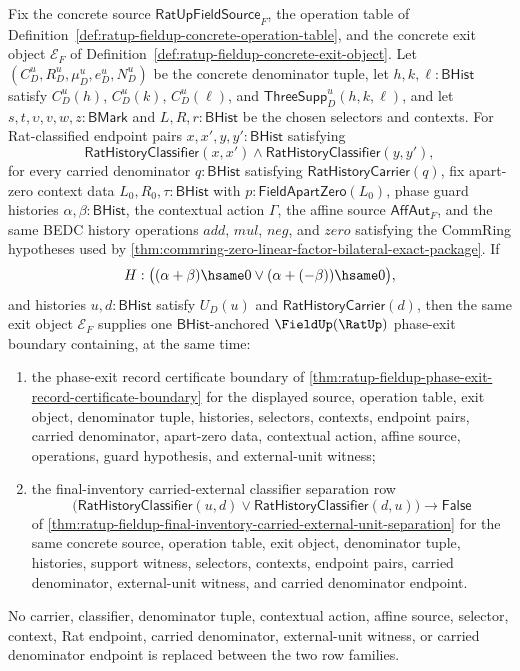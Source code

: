 \begin{theorem}
\label{thm:ratup-fieldup-phase-exit-record-final-inventory-separation}
Fix the concrete source $\mathsf{RatUpFieldSource}_F$, the operation table of
Definition~\ref{def:ratup-fieldup-concrete-operation-table}, and the concrete
exit object $\mathcal E_F$ of
Definition~\ref{def:ratup-fieldup-concrete-exit-object}. Let
$(C_D^u,R_D^u,\mu_D^u,e_D^u,N_D^u)$ be the concrete denominator tuple, let
$h,k,\ell:\mathsf{BHist}$ satisfy $C_D^u(h)$, $C_D^u(k)$, $C_D^u(\ell)$, and
$\mathsf{ThreeSupp}_D^u(h,k,\ell)$, and let
$s,t,\upsilon,v,w,z:\mathsf{BMark}$ and $L,R,r:\mathsf{BHist}$ be the chosen
selectors and contexts. For Rat-classified endpoint pairs
$x,x',y,y':\mathsf{BHist}$ satisfying
$$
\mathsf{RatHistoryClassifier}(x,x')
\land
\mathsf{RatHistoryClassifier}(y,y'),
$$
for every carried denominator $q:\mathsf{BHist}$ satisfying
$\mathsf{RatHistoryCarrier}(q)$, fix apart-zero context data
$L_0,R_0,\tau:\mathsf{BHist}$ with $p:\mathsf{FieldApartZero}(L_0)$, phase guard
histories $\alpha,\beta:\mathsf{BHist}$, the contextual action $\Gamma$, the
affine source $\mathsf{AffAut}_F$, and the same BEDC history operations $add$,
$mul$, $neg$, and $zero$ satisfying the CommRing hypotheses used by
\autoref{thm:commring-zero-linear-factor-bilateral-exact-package}. If
$$
H:\bigl((\alpha+\beta)\hsame0 \lor (\alpha+(-\beta))\hsame0\bigr),
$$
and histories $u,d:\mathsf{BHist}$ satisfy $U_D(u)$ and
$\mathsf{RatHistoryCarrier}(d)$, then the same exit object $\mathcal E_F$
supplies one $\mathsf{BHist}$-anchored $\FieldUp(\RatUp)$ phase-exit boundary
containing, at the same time:
\begin{enumerate}
  \item the phase-exit record certificate boundary of
  \autoref{thm:ratup-fieldup-phase-exit-record-certificate-boundary} for the
  displayed source, operation table, exit object, denominator tuple, histories,
  selectors, contexts, endpoint pairs, carried denominator, apart-zero data,
  contextual action, affine source, operations, guard hypothesis, and
  external-unit witness;
  \item the final-inventory carried-external classifier separation row
  $$
  \bigl(
  \mathsf{RatHistoryClassifier}(u,d)\lor
  \mathsf{RatHistoryClassifier}(d,u)
  \bigr)\to\mathsf{False}
  $$
  of
  \autoref{thm:ratup-fieldup-final-inventory-carried-external-unit-separation}
  for the same concrete source, operation table, exit object, denominator tuple,
  histories, support witness, selectors, contexts, endpoint pairs, carried
  denominator, external-unit witness, and carried denominator endpoint.
\end{enumerate}
No carrier, classifier, denominator tuple, contextual action, affine source,
selector, context, Rat endpoint, carried denominator, external-unit witness, or
carried denominator endpoint is replaced between the two row families.
\end{theorem}
